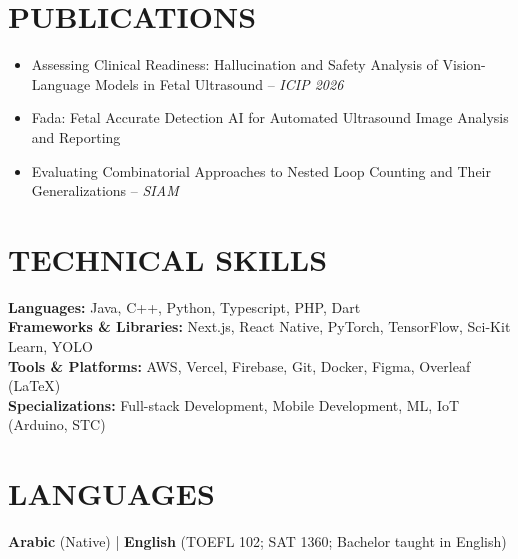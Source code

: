 \documentclass[11pt,a4paper]{article}
\begin{document}
\section*{PUBLICATIONS}
\begin{itemize}[leftmargin=0em, nosep, label={}]
    \item Assessing Clinical Readiness: Hallucination and Safety Analysis of Vision-Language Models in Fetal Ultrasound -- \textit{ICIP 2026}
    \item Fada: Fetal Accurate Detection AI for Automated Ultrasound Image Analysis and Reporting
    \item Evaluating Combinatorial Approaches to Nested Loop Counting and Their Generalizations -- \textit{SIAM}
\end{itemize}

\section*{TECHNICAL SKILLS}
\textbf{Languages:} Java, C++, Python, Typescript, PHP, Dart \\[4pt]
\textbf{Frameworks \& Libraries:} Next.js, React Native, PyTorch, TensorFlow, Sci-Kit Learn, YOLO \\[4pt]
\textbf{Tools \& Platforms:} AWS, Vercel, Firebase, Git, Docker, Figma, Overleaf (LaTeX) \\[4pt]
\textbf{Specializations:} Full-stack Development, Mobile Development, ML, IoT (Arduino, STC)

\section*{LANGUAGES}
\textbf{Arabic} (Native) \quad | \quad \textbf{English} (TOEFL 102; SAT 1360; Bachelor taught in English)
\end{document}
